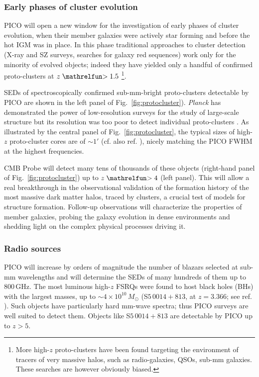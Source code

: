 \documentclass[PICOReport.tex]{subfiles}
\begin{document}
\subsubsection{Early phases of cluster evolution}

PICO will open a new window for the investigation of early phases of cluster
evolution,  when their member galaxies were actively star forming and before
the hot IGM was in place. In this phase traditional approaches to cluster
detection (X-ray and SZ surveys, searches for galaxy red sequences) work only
for the minority of evolved objects; indeed they have yielded only a handful of
confirmed proto-clusters at $z\simgt 1.5$ \cite{Overzier2016}\footnote{More
high-$z$ proto-clusters have been found targeting the environment of tracers of
very massive halos, such as radio-galaxies, QSOs, sub-mm galaxies. These
searches are however obviously biased.}.

SEDs of spectroscopically confirmed sub-mm-bright proto-clusters detectable by
PICO  are shown in the left panel of Fig.~\ref{fig:protocluster}).
\textit{Planck} has demonstrated the power of low-resolution surveys for the
study of large-scale structure  \cite{Planck2016high_z} but its resolution was
too poor to detect individual proto-clusters \cite{Negrello2017protocl}. As
illustrated by the central panel of Fig.~\ref{fig:protocluster}, the typical
sizes of high-$z$ proto-cluster cores are of $\sim 1'$ (cf. also ref.
\cite{Alberts2014}), nicely matching the PICO FWHM at the highest frequencies.

CMB Probe will detect many tens of thousands of these objects (right-hand panel
of  Fig.~\ref{fig:protocluster}) up to $z\simgt 4$ (left panel). This will
allow a real breakthrough in the observational validation of the formation
history of the most massive dark matter halos, traced by clusters, a crucial
test of models for structure formation. Follow-up observations will
characterize the properties of member galaxies, probing the galaxy evolution in
dense environments and shedding light on the complex physical processes driving
it.

\subsubsection{Radio sources}

PICO will increase by orders of magnitude the number of blazars selected at
sub-mm  wavelengths and will determine the SEDs of many hundreds of them up to
800\,GHz. The most luminous high-$z$ FSRQs were found to host black holes (BHs)
with the largest masses, up to $\sim 4\times 10^{10}\,M_\odot$ (S$5\,0014+813$,
at  $z = 3.366$; see ref. \cite{Ghisellini2009}). Such objects have
particularly hard mm-wave spectra; thus PICO surveys are well suited to detect
them. Objects like S$5\,0014+813$ are detectable by PICO up to $z>5$.
\end{document}
